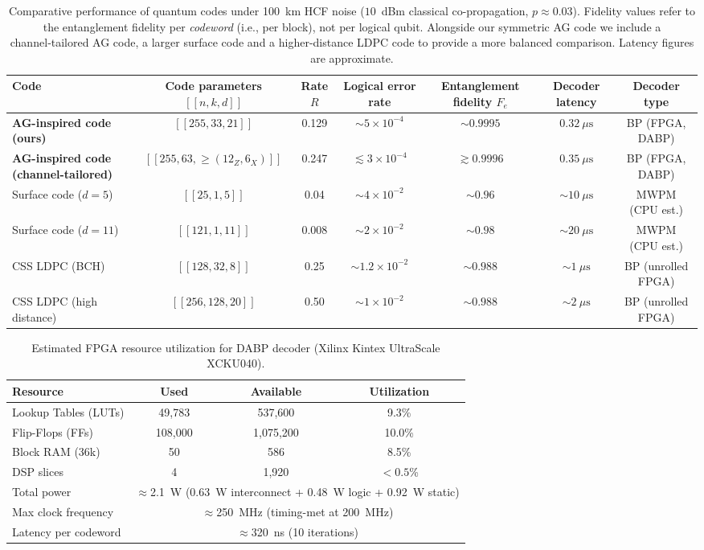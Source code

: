 \documentclass[conference]{IEEEtran}  %
\begin{document}
\begin{table*}[t]
\centering
\caption{Comparative performance of quantum codes under 100~km HCF noise ($10$~dBm classical co-propagation, $p\approx 0.03$).  Fidelity values refer to the entanglement fidelity per \emph{codeword} (i.e., per block), not per logical qubit.  Alongside our symmetric AG code we include a channel‑tailored AG code, a larger surface code and a higher-distance LDPC code to provide a more balanced comparison.  Latency figures are approximate.}
\label{tab:perf}
\begin{tabular}{lcccccc}
\hline
\textbf{Code} & \textbf{Code parameters $[[n,k,d]]$} & \textbf{Rate $R$} & \textbf{Logical error rate} & \textbf{Entanglement fidelity $F_e$} & \textbf{Decoder latency} & \textbf{Decoder type} \\
\hline
\textbf{AG-inspired code (ours)} & $[[255,33,21]]$ & 0.129 & $\sim5\times 10^{-4}$ & $\sim0.9995$ & $0.32~\mu\text{s}$ & BP (FPGA, DABP) \\
\textbf{AG-inspired code (channel-tailored)} & $[[255,63,\ge(12_Z,6_X)]]$ & 0.247 & $\lesssim3\times 10^{-4}$ & $\gtrsim0.9996$ & $0.35~\mu\text{s}$ & BP (FPGA, DABP) \\
Surface code ($d=5$) & $[[25,1,5]]$ & 0.04 & $\sim4\times 10^{-2}$ & $\sim0.96$ & $\sim10~\mu\text{s}$ & MWPM (CPU est.) \\
Surface code ($d=11$) & $[[121,1,11]]$ & 0.008 & $\sim2\times 10^{-2}$ & $\sim0.98$ & $\sim20~\mu\text{s}$ & MWPM (CPU est.) \\
CSS LDPC (BCH) & $[[128,32,8]]$ & 0.25 & $\sim1.2\times 10^{-2}$ & $\sim0.988$ & $\sim1~\mu\text{s}$ & BP (unrolled FPGA) \\
CSS LDPC (high distance) & $[[256,128,20]]$ & 0.50 & $\sim1\times 10^{-2}$ & $\sim0.988$ & $\sim2~\mu\text{s}$ & BP (unrolled FPGA) \\
\hline
\end{tabular}
\end{table*}

\begin{table}[t]
\centering
\caption{Estimated FPGA resource utilization for DABP decoder (Xilinx Kintex UltraScale XCKU040).}
\label{tab:resources}
\begin{tabular}{lccc}
\hline
\textbf{Resource} & \textbf{Used} & \textbf{Available} & \textbf{Utilization} \\
\hline
Lookup Tables (LUTs) & 49,783 & 537,600 & 9.3\% \\
Flip-Flops (FFs) & 108,000 & 1,075,200 & 10.0\% \\
Block RAM (36k) & 50 & 586 & 8.5\% \\
DSP slices & 4 & 1,920 & $<0.5$\% \\
Total power & \multicolumn{3}{c}{$\approx$2.1~W (0.63~W interconnect + 0.48~W logic + 0.92~W static)} \\
Max clock frequency & \multicolumn{3}{c}{$\approx$250~MHz (timing-met at 200~MHz)} \\
Latency per codeword & \multicolumn{3}{c}{$\approx$320~ns (10 iterations)} \\
\hline
\end{tabular}
\end{table}
\end{document}
